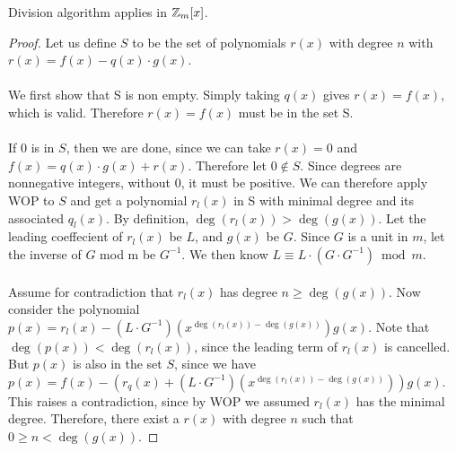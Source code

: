 \begin{theorem**}

    Division algorithm applies in $\mathbb{Z}_m[x]$.

\end{theorem**}

    \begin{proof}
    Let us define $S$ to be the set of polynomials $r(x)$ with degree $n$ with $r(x) = f(x) - q(x) \cdot g(x)$.\\\\
    We first show that S is non empty. Simply taking $q(x)$ gives $r(x) = f(x)$, which is valid. Therefore $r(x)=f(x)$ must be in the set S.\\\\
    If $0$ is in $S$, then we are done, since we can take $r(x)=0$ and $f(x) = q(x) \cdot g(x)+r(x)$. Therefore let $0 \not \in S$. Since degrees are nonnegative integers, without 0, it must be positive. We can therefore apply WOP to $S$ and get a polynomial $r_l(x)$ in S with minimal degree and its associated $q_l(x)$. By definition, $\deg(r_l(x)) >  \deg(g(x))$. Let the leading coeffecient of $r_l(x)$ be $L$, and $g(x)$ be $G$. Since $G$ is a unit in $m$, let the inverse of $G$ mod m be $G^{-1}$. We then know $L \equiv L \cdot (G \cdot G^{-1}) \bmod m$. \\\\
    Assume for contradiction that $r_l(x)$ has degree $n \geq \deg(g(x))$. Now consider the polynomial $p(x) = r_l(x)-(L \cdot G^{-1})(x^{\deg(r_l(x))-\deg(g(x))})g(x)$. Note that $\deg(p(x)) < \deg(r_l(x))$, since the leading term of $r_l(x)$ is cancelled. But $p(x)$ is also in the set $S$, since we have $p(x) = f(x) - (r_q(x) +(L \cdot G^{-1})(x^{\deg(r_l(x))-\deg(g(x))}) )g(x)$. This raises a contradiction, since by WOP we assumed $r_l(x)$ has the minimal degree. Therefore, there exist a $r(x)$ with degree $n$ such that $0 \geq n < \deg(g(x))$.
\end{proof}


